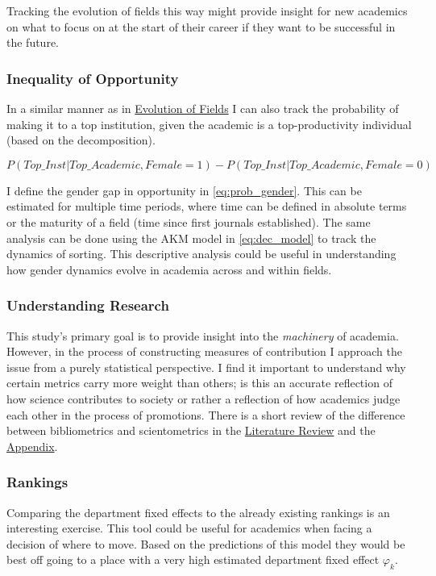 \documentclass[10pt]{report}
\begin{document}
Tracking the evolution of fields this way might provide insight for new academics on what to focus on at the start of their career if they want to be successful in the future.

\subsubsection*{Inequality of Opportunity}

In a similar manner as in \hyperref[ssec:evfield]{Evolution of Fields} I can also track the probability of making it to a top institution, given the academic is a top-productivity individual (based on the decomposition).

\begin{equation}
    \label{eq:prob_gender}
    P(Top\_Inst | Top\_Academic, Female = 1) - P(Top\_Inst | Top\_Academic, Female = 0)
\end{equation}

I define the gender gap in opportunity in \autoref{eq:prob_gender}. This can be estimated for multiple time periods, where time can be defined in absolute terms or the maturity of a field (time since first journals established). The same analysis can be done using the AKM model in \autoref{eq:dec_model} to track the dynamics of sorting. This descriptive analysis could be useful in understanding how gender dynamics evolve in academia across and within fields.


\subsubsection*{Understanding Research}

This study's primary goal is to provide insight into the \textit{machinery} of academia. However, in the process of constructing measures of contribution I approach the issue from a purely statistical perspective. I find it important to understand why certain metrics carry more weight than others; is this an accurate reflection of how science contributes to society or rather a reflection of how academics judge each other in the process of promotions. There is a short review of the difference between bibliometrics and scientometrics in the \hyperref[sec:lit]{Literature Review} and the \hyperref[ssec:bibvscient]{Appendix}.

\subsubsection*{Rankings}
\label{ssec:rankings}
Comparing the department fixed effects to the already existing rankings is an interesting exercise. This tool could be useful for academics when facing a decision of where to move. Based on the predictions of this model they would be best off going to a place with a very high estimated department fixed effect \(\varphi_k\).
\end{document}

